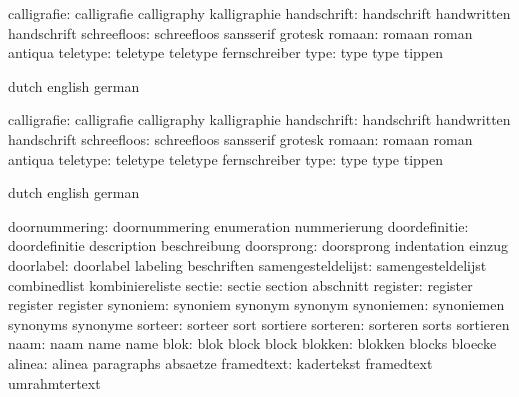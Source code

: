         calligrafie:  calligrafie          calligraphy         kalligraphie
        handschrift:  handschrift          handwritten         handschrift
        schreefloos:  schreefloos          sansserif           grotesk
             romaan:  romaan               roman               antiqua
           teletype:  teletype             teletype            fernschreiber
               type:  type                 type                tippen

\stopconstants

\startvariables       dutch                english             german

        calligrafie:  calligrafie          calligraphy         kalligraphie
        handschrift:  handschrift          handwritten         handschrift
        schreefloos:  schreefloos          sansserif           grotesk
             romaan:  romaan               roman               antiqua
           teletype:  teletype             teletype            fernschreiber
               type:  type                 type                tippen

\stopvariables




\startsetupvariables  dutch                english             german

      doornummering:  doornummering        enumeration         nummerierung
      doordefinitie:  doordefinitie        description         beschreibung
         doorsprong:  doorsprong           indentation         einzug
          doorlabel:  doorlabel            labeling            beschriften
 samengesteldelijst:  samengesteldelijst   combinedlist        kombiniereliste
             sectie:  sectie               section             abschnitt
           register:  register             register            register
           synoniem:  synoniem             synonym             synonym
         synoniemen:  synoniemen           synonyms            synonyme
            sorteer:  sorteer              sort                sortiere
           sorteren:  sorteren             sorts               sortieren   
               naam:  naam                 name                name
               blok:  blok                 block               block
            blokken:  blokken              blocks              bloecke
             alinea:  alinea               paragraphs          absaetze
         framedtext:  kadertekst           framedtext          umrahmtertext

